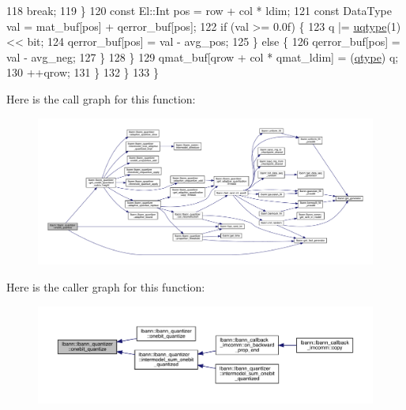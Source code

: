 \begin{DoxyCode}
118           \textcolor{keywordflow}{break};
119         \}
120         \textcolor{keyword}{const} El::Int pos = row + col * ldim;
121         \textcolor{keyword}{const} DataType val = mat\_buf[pos] + qerror\_buf[pos];
122         \textcolor{keywordflow}{if} (val >= 0.0f) \{
123           q |= \hyperlink{classlbann_1_1lbann__quantizer_ac8b63c86fc871e248ce20c7af19a7fad}{uqtype}(1) << bit;
124           qerror\_buf[pos] = val - avg\_pos;
125         \} \textcolor{keywordflow}{else} \{
126           qerror\_buf[pos] = val - avg\_neg;
127         \}
128       \}
129       qmat\_buf[qrow + col * qmat\_ldim] = (\hyperlink{classlbann_1_1lbann__quantizer_afcda642ff1b44d31eec910909c3d013e}{qtype}) q;
130       ++qrow;
131     \}
132   \}
133 \}
\end{DoxyCode}
Here is the call graph for this function\+:\nopagebreak
\begin{figure}[H]
\begin{center}
\leavevmode
\includegraphics[width=350pt]{classlbann_1_1lbann__quantizer_a4dd4696cbbfd93c73e5fb3c40fcb16c3_cgraph}
\end{center}
\end{figure}
Here is the caller graph for this function\+:\nopagebreak
\begin{figure}[H]
\begin{center}
\leavevmode
\includegraphics[width=350pt]{classlbann_1_1lbann__quantizer_a4dd4696cbbfd93c73e5fb3c40fcb16c3_icgraph}
\end{center}
\end{figure}
\mbox{\label{classlbann_1_1lbann__quantizer_a9eeb89150026bf4b7bea15bffdba10d3}} 

